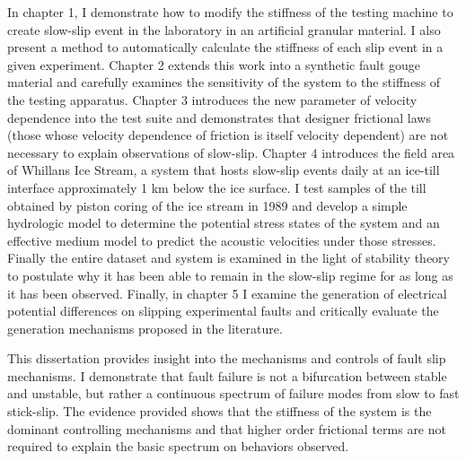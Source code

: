\documentclass[11pt]{psuthesis}
\begin{document}
\begin{frontmatter}
In chapter 1, I demonstrate how to modify the stiffness of the testing machine to create slow-slip event in the laboratory in an artificial granular material. I also present a method to automatically calculate the stiffness of each slip event in a given experiment. Chapter 2 extends this work into a synthetic fault gouge material and carefully examines the sensitivity of the system to the stiffness of the testing apparatus. Chapter 3 introduces the new parameter of velocity dependence into the test suite and demonstrates that designer frictional laws (those whose velocity dependence of friction is itself velocity dependent) are not necessary to explain observations of slow-slip. Chapter 4 introduces the field area of Whillans Ice Stream, a system that hosts slow-slip events daily at an ice-till interface approximately 1 km below the ice surface. I test samples of the till obtained by piston coring of the ice stream in 1989 and develop a simple hydrologic model to determine the potential stress states of the system and an effective medium model to predict the acoustic velocities under those stresses. Finally the entire dataset and system is examined in the light of stability theory to postulate why it has been able to remain in the slow-slip regime for as long as it has been observed. Finally, in chapter 5 I examine the generation of electrical potential differences on slipping experimental faults and critically evaluate the generation mechanisms proposed in the literature.

This dissertation provides insight into the mechanisms and controls of fault slip mechanisms. I demonstrate that fault failure is not a bifurcation between stable and unstable, but rather a continuous spectrum of failure modes from slow to fast stick-slip. The evidence provided shows that the stiffness of the system is the dominant controlling mechanisms and that higher order frictional terms are not required to explain the basic spectrum on behaviors observed.





\end{frontmatter}
\end{document}
